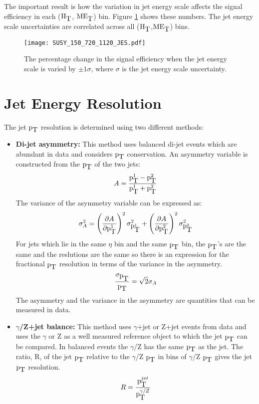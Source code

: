 The important result is how the variation in jet energy scale affects the signal
efficiency in each ($\mbox{H}_{\mbox{T}}$, $\mbox{ME}_{\mbox{T}}$) bin. Figure \ref{fig:JES_Numbers} shows these
numbers. The jet energy scale uncertainties are correlated across all 
($\mbox{H}_{\mbox{T}}$,$\mbox{ME}_{\mbox{T}}$) bins.

\begin{figure}
\begin{center}
\texttt{[image: SUSY\_150\_720\_1120\_JES.pdf]}
\end{center}
\caption{The percentage change in the signal efficiency when the jet energy
scale is varied by $\pm1\sigma$, where $\sigma$ is the jet energy scale
uncertainty.}
\label{fig:JES_Numbers}
\end{figure}

\section{Jet Energy Resolution}

The jet $\mbox{p}_{\mbox{T}}$ resolution is determined using two different methods: 

\begin{itemize}
\item {\bf Di-jet asymmetry:} This method uses balanced di-jet events which are 
abundant in data and considers $\mbox{p}_{\mbox{T}}$ conservation. An asymmetry variable is 
constructed from the $\mbox{p}_{\mbox{T}}$ of the two jets:
\begin{equation}
A = \frac{\mbox{p}_{\mbox{T}}^{1} - \mbox{p}_{\mbox{T}}^{2}}{\mbox{p}_{\mbox{T}}^{1} + \mbox{p}_{\mbox{T}}^{2}}
\end{equation}
The variance of the asymmetry variable can be expressed as:
\begin{equation}
\sigma_{A}^{2} = \left(\frac{\partial A}{\partial
\mbox{p}_{\mbox{T}}^{1}}\right)^{2}\sigma_{\mbox{p}_{\mbox{T}}^{1}}^{2} + \left(\frac{\partial A}{\partial
\mbox{p}_{\mbox{T}}^{2}}\right)^{2}\sigma_{\mbox{p}_{\mbox{T}}^{2}}^{2}
\end{equation}
For jets which lie in the same $\eta$ bin and the same $\mbox{p}_{\mbox{T}}$ bin, the $\mbox{p}_{\mbox{T}}$'s
are the same and the reslutions are the same so there is an expression for the
fractional $\mbox{p}_{\mbox{T}}$ resolution in terms of the variance in the asymmetry.
\begin{equation}
\frac{\sigma_{\mbox{p}_{\mbox{T}}}}{\mbox{p}_{\mbox{T}}} = \sqrt{2}\sigma_{A}
\end{equation}  
The asymmetry and the variance in the asymmetry are quantities that can be 
measured in data.
\item {\bf $\gamma$/Z+jet balance:} This method uses $\gamma$+jet or Z+jet
events from data and uses the $\gamma$ or Z as a well measured reference object
to which the jet $\mbox{p}_{\mbox{T}}$ can be compared. In balanced events the $\gamma$/Z has 
the same $\mbox{p}_{\mbox{T}}$ as the jet. The ratio, R, of the jet $\mbox{p}_{\mbox{T}}$ relative to the 
$\gamma$/Z $\mbox{p}_{\mbox{T}}$ in bins of $\gamma$/Z $\mbox{p}_{\mbox{T}}$ gives the jet $\mbox{p}_{\mbox{T}}$ resolution. 
\begin{equation}
R = \frac{\mbox{p}_{\mbox{T}}^{jet}}{\mbox{p}_{\mbox{T}}^{\gamma/Z}}
\end{equation}
\end{itemize}

